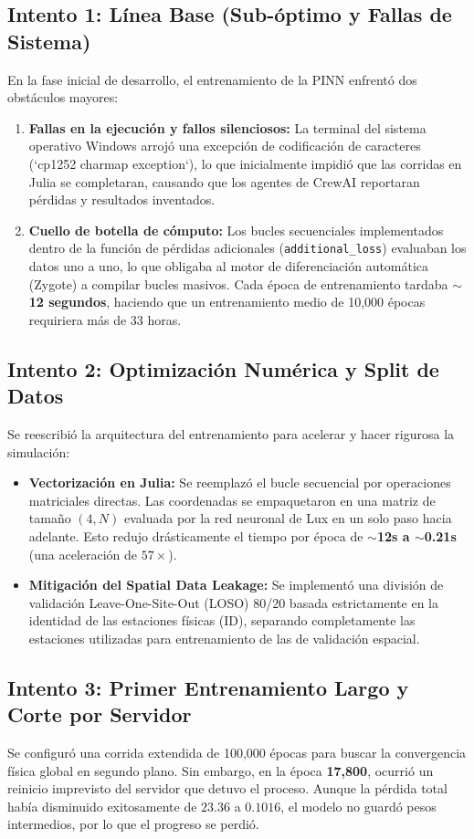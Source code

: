 \documentclass[11pt,letterpaper]{article}
\begin{document}
\subsection{Intento 1: Línea Base (Sub-óptimo y Fallas de Sistema)}
En la fase inicial de desarrollo, el entrenamiento de la PINN enfrentó dos obstáculos mayores:
\begin{enumerate}
    \item \textbf{Fallas en la ejecución y fallos silenciosos:} La terminal del sistema operativo Windows arrojó una excepción de codificación de caracteres (`cp1252 charmap exception`), lo que inicialmente impidió que las corridas en Julia se completaran, causando que los agentes de CrewAI reportaran pérdidas y resultados inventados.
    \item \textbf{Cuello de botella de cómputo:} Los bucles secuenciales implementados dentro de la función de pérdidas adicionales (\texttt{additional\_loss}) evaluaban los datos uno a uno, lo que obligaba al motor de diferenciación automática (Zygote) a compilar bucles masivos. Cada época de entrenamiento tardaba \textbf{\(\sim\)12 segundos}, haciendo que un entrenamiento medio de 10,000 épocas requiriera más de 33 horas.
\end{enumerate}

\subsection{Intento 2: Optimización Numérica y Split de Datos}
Se reescribió la arquitectura del entrenamiento para acelerar y hacer rigurosa la simulación:
\begin{itemize}
    \item \textbf{Vectorización en Julia:} Se reemplazó el bucle secuencial por operaciones matriciales directas. Las coordenadas se empaquetaron en una matriz de tamaño $(4, N)$ evaluada por la red neuronal de Lux en un solo paso hacia adelante. Esto redujo drásticamente el tiempo por época de \textbf{\(\sim\)12s a \(\sim\)0.21s} (una aceleración de \(57\times\)).
    \item \textbf{Mitigación del Spatial Data Leakage:} Se implementó una división de validación Leave-One-Site-Out (LOSO) 80/20 basada estrictamente en la identidad de las estaciones físicas (ID), separando completamente las estaciones utilizadas para entrenamiento de las de validación espacial.
\end{itemize}

\subsection{Intento 3: Primer Entrenamiento Largo y Corte por Servidor}
Se configuró una corrida extendida de 100,000 épocas para buscar la convergencia física global en segundo plano. Sin embargo, en la época \textbf{17,800}, ocurrió un reinicio imprevisto del servidor que detuvo el proceso. Aunque la pérdida total había disminuido exitosamente de $23.36$ a $0.1016$, el modelo no guardó pesos intermedios, por lo que el progreso se perdió.
\end{document}
